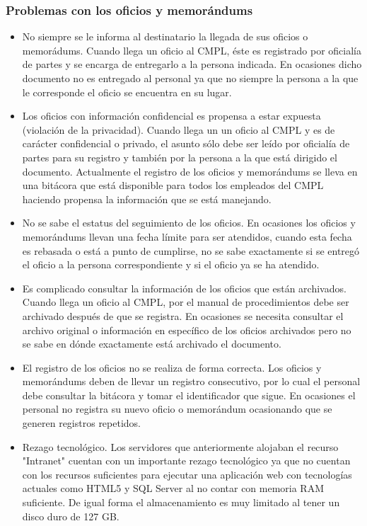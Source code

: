 		\subsubsection{Problemas con los oficios y memorándums}
\begin{itemize}
	\item No siempre se le informa al destinatario la llegada de sus oficios o memorádums.
Cuando llega un oficio al CMPL, éste es registrado por oficialía de partes y se encarga de entregarlo a la persona indicada. En ocasiones dicho documento no es entregado al personal ya que no siempre la persona a la que le corresponde el oficio se encuentra en su lugar. 

	\item Los oficios con información confidencial es propensa a estar expuesta (violación de la privacidad).
Cuando llega un un oficio al CMPL y es de carácter confidencial o privado, el asunto sólo debe ser leído por oficialía de partes para su registro y también por la persona a la que está dirigido el documento. Actualmente el registro de los oficios y memorándums se lleva en una bitácora que está disponible para todos los empleados del CMPL haciendo propensa la información que se está manejando.

	\item No se sabe el estatus del seguimiento de los oficios.
En ocasiones los oficios y memorándums llevan una fecha límite para ser atendidos, cuando esta fecha es rebasada o está a punto de cumplirse, no se sabe exactamente si se entregó el oficio a la persona correspondiente y si el oficio ya se ha atendido.

	\item Es complicado consultar la información de los oficios que están archivados.
Cuando llega un oficio al CMPL, por el manual de procedimientos debe ser archivado después de que se registra. En ocasiones se necesita consultar el archivo original o información en específico de los oficios archivados pero no se sabe en dónde exactamente está archivado el documento.	
	
	\item El registro de los oficios no se realiza de forma correcta.
Los oficios y memorándums deben de llevar un registro consecutivo, por lo cual el personal debe consultar la bitácora y tomar el identificador que sigue. En ocasiones el personal no registra su nuevo oficio o memorándum ocasionando que se generen registros repetidos.	
	
	\item Rezago tecnológico.
Los servidores que anteriormente alojaban el recurso "Intranet" cuentan con un importante rezago tecnológico ya que no cuentan con los recursos suficientes para ejecutar una aplicación web con tecnologías actuales como HTML5 y SQL Server al no contar con memoria RAM suficiente. De igual forma el almacenamiento es muy limitado al tener un disco duro de 127 GB.
	

\end{itemize}

